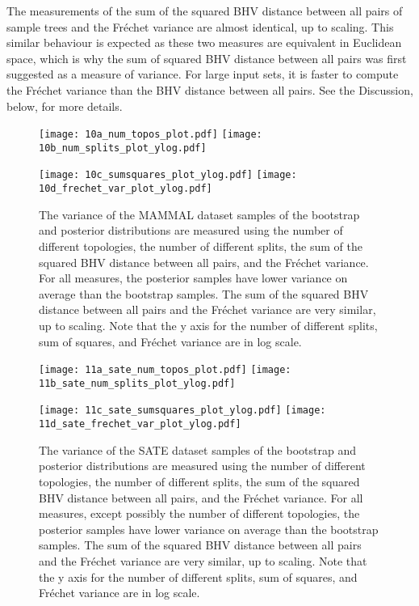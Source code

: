 \documentclass[12pt,letterpaper]{article}
\theoremstyle{plain}
\theoremstyle{definition}
\begin{document}
The measurements of the sum of the squared BHV distance between all pairs of sample trees and the Fr\'echet variance are almost identical, up to scaling.  This similar behaviour is expected as these two measures are equivalent in Euclidean space, which is why the sum of squared BHV distance between all pairs was first suggested as a measure of variance.  For large input sets, it is faster to compute the Fr\'echet variance than the BHV distance between all pairs.  See the Discussion, below, for more details. 


\begin{figure}[!htb]
\centering
\texttt{[image: 10a\_num\_topos\_plot.pdf]}
\texttt{[image: 10b\_num\_splits\_plot\_ylog.pdf]} 

\texttt{[image: 10c\_sumsquares\_plot\_ylog.pdf]}
\texttt{[image: 10d\_frechet\_var\_plot\_ylog.pdf]} 

\caption{The variance of the MAMMAL dataset samples of the bootstrap and posterior distributions are measured using the number of different topologies, the number of different splits, the sum of the squared BHV distance between all pairs, and the Fr\'echet variance.  For all measures, the posterior samples have lower variance on average than the bootstrap samples.  The sum of the squared BHV distance between all pairs and the Fr\'echet variance are very similar, up to scaling.  Note that the y axis for the number of different splits, sum of squares, and Fr\'echet variance are in log scale.}
\centering
\label{f:mammal_all_vars}
\end{figure}
 
 
\begin{figure}[!htb]
\centering
\texttt{[image: 11a\_sate\_num\_topos\_plot.pdf]}
\texttt{[image: 11b\_sate\_num\_splits\_plot\_ylog.pdf]} 

\texttt{[image: 11c\_sate\_sumsquares\_plot\_ylog.pdf]}
\texttt{[image: 11d\_sate\_frechet\_var\_plot\_ylog.pdf]} 

\caption{The variance of the SATE dataset samples of the bootstrap and posterior distributions are measured using the number of different topologies, the number of different splits, the sum of the squared BHV distance between all pairs, and the Fr\'echet variance.  For all measures, except possibly the number of different topologies, the posterior samples have lower variance on average than the bootstrap samples.  The sum of the squared BHV distance between all pairs and the Fr\'echet variance are very similar, up to scaling.  Note that the y axis for the number of different splits, sum of squares, and Fr\'echet variance are in log scale.}
\centering
\label{f:sate_all_vars}
\end{figure}
 
\end{document}
